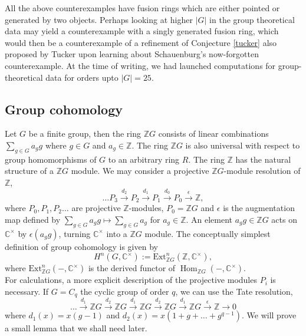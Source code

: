 \documentclass[a4paper, 10pt]{book}
\theoremstyle{definition}
\numberwithin{equation}{chapter}
\newcommand\Hom{\operatorname{Hom}}
\newcommand\CC{\mathbb C}
\newcommand\ZZ{\mathbb Z}
\newcommand\kk{\mathbb C}
\newcommand\Z{\mathbb Z}
\newcommand{\ra}\rightarrow
\newcommand{\xra}\xrightarrow
\begin{document}
All the above counterexamples have fusion rings which are either pointed or generated by two objects. Perhaps looking at higher $|G|$ in the group theoretical data may yield a counterexample with a singly generated fusion ring, which would then be a counterexample of a refinement of Conjecture \ref{tucker} also proposed by Tucker upon learning about Schauenburg's now-forgotten counterexample.
At the time of writing, we had launched computations for group-theoretical data for orders upto $|G|=25$.




\begin{appendices}
\chapter{Group cohomology}\label{groupcoho}
Let $G$ be a finite group, then the ring $\ZZ G$ consists of linear combinations $
	\sum_{g\in G} a_g g$
 where $g \in G$ and $a_g\in \ZZ$.  The ring $\ZZ G$ is also universal with respect to group homomorphisms of $G$ to an arbitrary ring $R$.
The ring $\ZZ$ has the natural structure of a $\ZZ G$ module. We may consider a projective $\ZZ G$-module resolution of $\ZZ$, \begin{equation*}
	\dots P_3 \xra{d_2} P_2 \xra{d_1} P_1 \xra{d_0} P_0\xra{\epsilon} \Z,
\end{equation*}  where $ P_0, P_1, P_2\dots$ are projective $\ZZ$-modules, $P_0 = \ZZ G$ and $\epsilon$ is the augmentation map defined by $\sum_{g\in G} a_g g \mapsto \sum_{g\in G}a_g$ for $a_g \in \ZZ$. An element $a_gg \in \ZZ G$ acts on $\kk^\times$ by $\epsilon(a_g g)$, turning $\kk^\times$ into a $\ZZ G$ module. The conceptually simplest definition of group cohomology is given by \begin{equation*}
	H^n(G, \CC^\times) := \text{Ext}^n_{\ZZ G}(\ZZ, \CC^\times),
\end{equation*}
where $\text{Ext}^n_{\ZZ G} (-, \CC^\times)$ is the derived functor of $\Hom_{\ZZ G}(-, \CC^\times)$.\\
For calculations, a more explicit description of the projective modules $P_i$ is necessary. If $G=C_q$ the  cyclic group of order $q$, we can use the Tate resolution, \begin{equation}\dots\xra{d_1}
\ZZ G \xra{d_2}\ZZ G\xra{d_1} \ZZ G \xra{d_2} \ZZ G\xra{d_1} \ZZ G\xra{\epsilon}\ZZ\ra 0	\label{tate}
\end{equation} where $d_1 (x) = x(g-1)$ and $d_2(x) = x(1+g + \dots + g^{q-1}) $.
We will prove a small lemma that we shall need later.

\end{appendices}
\end{document}

